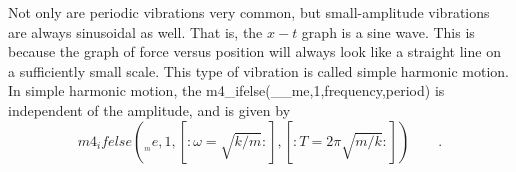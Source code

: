 \begin{summary}
\begin{summarytext}
Not only are periodic vibrations very common, but small-amplitude
vibrations are always sinusoidal as well. That is, the $x-t$
graph is a sine wave. This is because the graph of force
versus position will always look like a straight line on a
sufficiently small scale. This type of vibration is called
simple harmonic motion. In simple harmonic motion, the
m4_ifelse(__me,1,frequency,period) is independent of the amplitude, and is given by
\begin{equation*}
m4_ifelse(__me,1,[:\omega=\sqrt{k/m}:],[:T=2\pi\sqrt{m/k}:]) \qquad .
\end{equation*}

\end{summarytext}

\end{summary}
